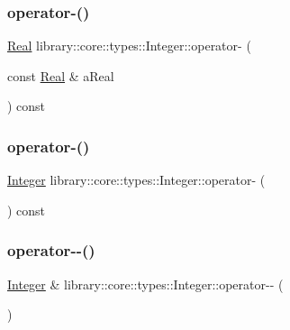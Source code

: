 \subsubsection{\texorpdfstring{operator-\/()}{operator-()}\hspace{0.1cm}{\footnotesize\ttfamily [3/4]}}
{\footnotesize\ttfamily \mbox{\hyperlink{classlibrary_1_1core_1_1types_1_1_real}{Real}} library\+::core\+::types\+::\+Integer\+::operator-\/ (\begin{DoxyParamCaption}\item[{const \mbox{\hyperlink{classlibrary_1_1core_1_1types_1_1_real}{Real}} \&}]{a\+Real }\end{DoxyParamCaption}) const}

\mbox{\label{classlibrary_1_1core_1_1types_1_1_integer_ad9670b50ae46bc0f09e4995e445dab99}} 
\subsubsection{\texorpdfstring{operator-\/()}{operator-()}\hspace{0.1cm}{\footnotesize\ttfamily [4/4]}}
{\footnotesize\ttfamily \mbox{\hyperlink{classlibrary_1_1core_1_1types_1_1_integer}{Integer}} library\+::core\+::types\+::\+Integer\+::operator-\/ (\begin{DoxyParamCaption}{ }\end{DoxyParamCaption}) const}

\mbox{\label{classlibrary_1_1core_1_1types_1_1_integer_aa57a45cc369f42e8a5f98391e26b6549}} 
\subsubsection{\texorpdfstring{operator-\/-\/()}{operator--()}\hspace{0.1cm}{\footnotesize\ttfamily [1/2]}}
{\footnotesize\ttfamily \mbox{\hyperlink{classlibrary_1_1core_1_1types_1_1_integer}{Integer}} \& library\+::core\+::types\+::\+Integer\+::operator-\/-\/ (\begin{DoxyParamCaption}{ }\end{DoxyParamCaption})}

